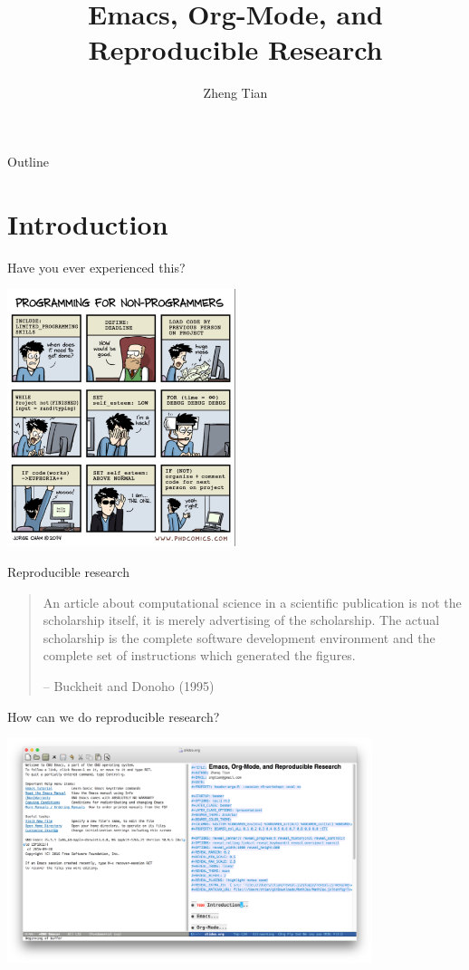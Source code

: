 \documentclass[presentation]{beamer}
\author{Zheng Tian}
\date{}
\title{Emacs, Org-Mode, and Reproducible Research}
\begin{document}
\maketitle
\begin{frame}{Outline}
\setcounter{tocdepth}{1}
\tableofcontents
\end{frame}


\section{Introduction}
\label{sec:orgbb2cf4a}

\begin{frame}[label={sec:orgffe2b15}]{Have you ever experienced this?}
\begin{center}
\includegraphics[width=0.5\textwidth]{figure/phdcomics.png}
\end{center}
\end{frame}


\begin{frame}[label={sec:orgdb0cdf5}]{Reproducible research}
\begin{quote}
An article about computational science in a scientific publication is
not the scholarship itself, it is merely advertising of the
scholarship. The actual scholarship is the complete software
development environment and the complete set of instructions which
generated the figures.

-- Buckheit and Donoho (1995)
\end{quote}
\end{frame}


\begin{frame}[label={sec:org54a9f4a}]{How can we do reproducible research?}
\begin{center}
\includegraphics[width=0.8\textwidth]{figure/emacs_startup.png}
\end{center}
\end{frame}
\end{document}
